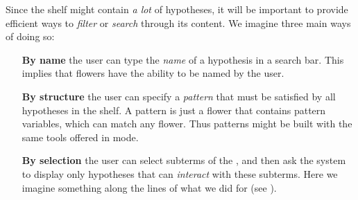 Since the shelf might contain \emph{a lot} of hypotheses, it will be important
to provide efficient ways to \emph{filter} or \emph{search} through its content.
We imagine three main ways of doing so:
\begin{itemize}
  \item[\textbf{By name}] the user can type the \emph{name} of a hypothesis in a
  search bar. This implies that flowers have the ability to be named by the
  user.
  \item[\textbf{By structure}] the user can specify a \emph{pattern} that must
  be satisfied by all hypotheses in the shelf. A pattern is just a flower that
  contains pattern variables, which can match any flower. Thus patterns might be
  built with the same tools offered in \Edit mode.
  \item[\textbf{By selection}] the user can select subterms of the , and
  then ask the system to display only hypotheses that can \emph{interact} with
  these subterms. Here we imagine something along the lines of what we did for
   (see ).
\end{itemize}




